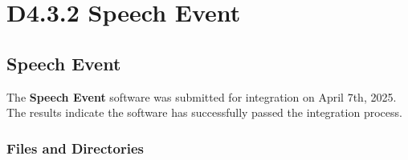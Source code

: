\documentclass{CSSRforAfrica}
\begin{document}
 \newpage
 \section{D4.3.2 Speech Event} 
\subsection{Speech Event} 
\label{subsection:speech_event}
The \textbf{Speech Event} software was submitted for integration on April 7th, 2025. The results indicate the software has successfully passed the integration process. 

\subsubsection{Files and Directories}
 
\end{document}
